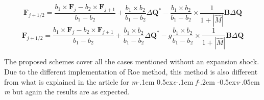 \documentclass[a4paper, 12pt]{article}
\newcommand\mefvm{%
    \textit{m}\kern-.1em%
    \raise0.5ex\hbox{\textit{e}}\kern-.1em%
    \textit{f}\kern-.2em%
    \raise-0.5ex\hbox{\textit{v}}\kern-.05em%
    \textit{m}
}
\begin{document}
\begin{equation}
    \mathbf{F}_{j+1/2}=\dfrac{b_1\times\textbf{F}_j-b_2\times\textbf{F}_{j+1}}{b_1-b_2}+\dfrac{b_1\times b_2}{b_1-b_2}\Delta\textbf{Q}^*-\dfrac{b_1\times b_2}{b_1-b_2}\times\dfrac{1}{1+|\hat M|}\textbf{B}\Delta\textbf{Q}
    \label{roem1}
\end{equation}
\begin{equation}
    \mathbf{F}_{j+1/2}=\dfrac{b_1\times\textbf{F}_j-b_2\times\textbf{F}_{j+1}}{b_1-b_2}+\dfrac{b_1\times b_2}{b_1-b_2}\Delta\textbf{Q}^*-g\dfrac{b_1\times b_2}{b_1-b_2}\times\dfrac{1}{1+|\hat M|}\textbf{B}\Delta\textbf{Q}
    \label{roem2}
\end{equation}\par
The proposed schemes cover all the cases mentioned without an expansion shock. Due to the different implementation of Roe method, this method is also different from what is explained in the article for \mefvm but again the results are as expected.
\end{document}
